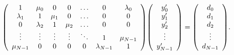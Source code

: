 \documentclass{article}
\newenvironment{MyMatrix}{\begin{array}({*{20}{c}})}{\end{array}}
\begin{document}
\begin{equation}
\begin{MyMatrix}
1         & \mu_0     &    0   &   0    & \dots  &      0        & \lambda_0 \\
\lambda_1 &  1        & \mu_1  &   0    & \dots  &      0        &     0     \\
0         & \lambda_2 &   1    & \mu_2  & \dots  &      0        &     0     \\
\vdots    & \vdots    & \vdots & \vdots & \ddots &      1        & \mu_{N-1} \\
\mu_{N-1} &   0       &   0    &   0    &   0    & \lambda_{N-1} &  1     
\end{MyMatrix}
\begin{MyMatrix} y'_0 \\ y'_1 \\ y'_2 \\ \vdots \\ y'_{N-1} \end{MyMatrix} =
\begin{MyMatrix} d_0  \\  d_1 \\  d_2 \\ \vdots \\  d_{N-1} \end{MyMatrix} .
\end{equation}
\end{document}
